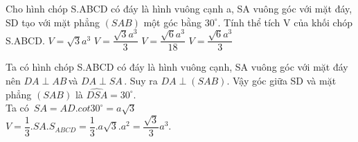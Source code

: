 \begin{ex}%
Cho hình chóp S.ABCD có đáy là hình vuông cạnh a, SA vuông góc với mặt đáy, SD tạo với mặt phẳng $\left(SAB\right)$ một góc bằng $ 30^\circ $. Tính thể tích V của khối chóp S.ABCD.
\choice
{$ V=\sqrt{3}{a^3}$}
{\True $ V=\dfrac{\sqrt{3}{a^3}}{3}$}
{$ V=\dfrac{\sqrt{6}{a^3}}{18}$}
{$ V=\dfrac{\sqrt{6}{a^3}}{3}$}
\loigiai
{\begin{center}
\end{center}
Ta có hình chóp S.ABCD có đáy là hình vuông cạnh, SA vuông góc với mặt đáy nên $ DA\perp AB\,$và $ DA\perp SA\,$. Suy ra $ DA\perp\left(SAB\right)$. Vậy góc giữa SD và mặt phẳng $\left(SAB\right)$ là $\widehat{DSA}=30^\circ $.\\
Ta có $\,SA=AD.cot30^\circ=a\sqrt{3}$\\
$ V=\dfrac{1}{3}.SA.S_{ABCD}=\dfrac{1}{3}.a\sqrt{3}.a^2=\dfrac{\sqrt{3}}{3}{a^3}$.}
\end{ex}

